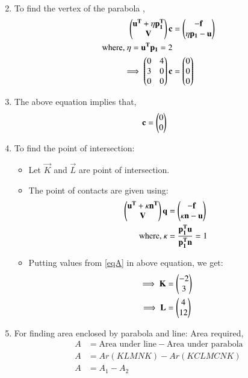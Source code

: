 \documentclass[journal,12pt,twocolumn]{IEEEtran}
\begin{document}
\begin{enumerate}
\begin{align}
\end{align}
\item To find the vertex of the parabola ,
\begin{align} \begin{pmatrix}\mathbf{u^T}+\eta\mathbf{p_1^T}\\\mathbf{V} \end{pmatrix}\mathbf{c} &= \begin{pmatrix}\mathbf{-f}\\\eta \mathbf{p_1} -\mathbf{u}\end{pmatrix}
\\
\text{where, }  \eta = \mathbf{u^T}\mathbf{p_1} = 2
\\
\implies\begin{pmatrix}0 & 4\\3 & 0 \\0 & 0\end{pmatrix} \mathbf{c}&= \begin{pmatrix}0\\0\\0\end{pmatrix}
\end{align}
\item The above equation implies that,
\begin{align}    
   \mathbf{c} &= \begin{pmatrix}0 \\ 0\end{pmatrix}
\end{align}
\item To find the point of intersection:
\begin{itemize}
    \item Let $\vec{K}$ and $\vec{L}$ are point of intersection.
    \item The point of contacts are given using:
\begin{align} \begin{pmatrix}\mathbf{u^T}+\kappa\mathbf{n^T}\\\mathbf{V} \end{pmatrix}\mathbf{q} &= \begin{pmatrix}\mathbf{-f}\\\kappa \mathbf{n} -\mathbf{u}\end{pmatrix}
\\
\text{where, }  \kappa &= \frac{\mathbf{p_1^T}\mathbf{u}}{\mathbf{p_1^T}\mathbf{n}} = 1
\end{align}
\item Putting values from \eqref{eqA} in above equation, we get:
\begin{align}
\implies \mathbf{K}&= \begin{pmatrix}-2\\3\end{pmatrix}  
\\
\implies \mathbf{L}&= \begin{pmatrix}4\\12\end{pmatrix}
\end{align}
\end{itemize}
\item For finding area enclosed by parabola and line:
  Area required,
\begin{align}
   A&= \text{Area under line} - \text{Area under parabola}
     \\
   A&= Ar(KLMNK)-Ar(KCLMCNK)
    \\
    A&= A_1 -A_2 \label{eqAREA}
    \end{align}

\end{enumerate}
\end{document}
